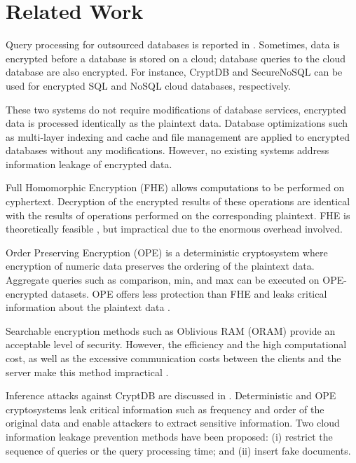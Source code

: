 \section{Related Work}
\label{sec:relatedWork}

Query processing for outsourced databases is reported in \cite{popa2011cryptdb,Ahmadian2016SecureNoSQL,7889242}. Sometimes, data is encrypted before a database is stored on a cloud; database queries to the cloud database are also encrypted. For instance, CryptDB \cite{popa2011cryptdb} and SecureNoSQL \cite{Ahmadian2016SecureNoSQL} can be used for encrypted SQL and NoSQL cloud databases, respectively. 

These two systems do not require modifications of database services, encrypted data is processed identically as the plaintext data. Database optimizations such as multi-layer indexing and cache and file management are applied to encrypted databases without any modifications. However, no existing systems address information leakage of encrypted data.

Full Homomorphic Encryption (FHE) allows computations to be performed on cyphertext. Decryption of the encrypted results of these operations are identical with the results of operations performed on the corresponding plaintext. FHE is theoretically feasible \cite{gentry2010computing}, but impractical due to the enormous overhead involved.

Order Preserving Encryption (OPE) is a deterministic cryptosystem where encryption of numeric data preserves the ordering of the plaintext data. Aggregate queries such as comparison, min, and max can be executed on OPE-encrypted datasets. OPE offers less protection than FHE and leaks critical information about the plaintext data \cite{ahmadian2014security, boldyreva2009order}. 

Searchable encryption methods such as Oblivious RAM (ORAM) \cite{liu2014search, ostrovsky1990efficient} provide an acceptable level of security. However, the efficiency and the high computational cost, as well as the excessive communication costs between the clients and the server make this method impractical \cite{goldreich1996software}.

Inference attacks against CryptDB are discussed in \cite{naveed2015inference}. Deterministic and OPE cryptosystems leak critical information such as frequency and order of the original data and enable attackers to extract sensitive information. Two cloud information leakage prevention methods have been proposed: (i) restrict the sequence of queries or the query processing time; and (ii) insert fake documents.

